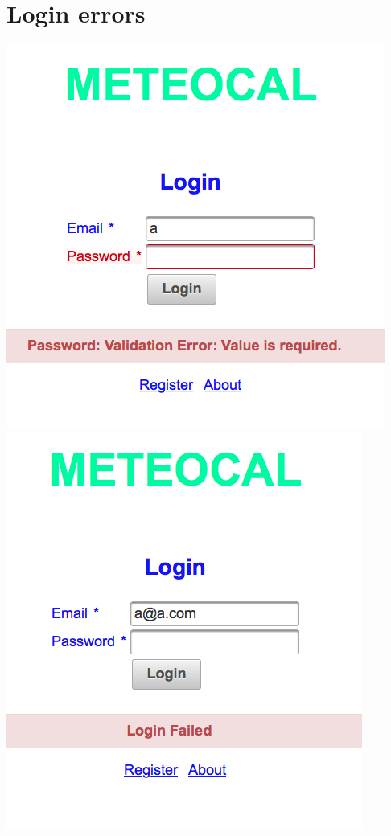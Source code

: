 \documentclass[10pt,a4paper,titlepage]{article}
\begin{document}
\section{Login errors}
\begin{center}
\includegraphics[width=0.7\linewidth]{./images/30_error_login_1}
\includegraphics[width=0.7\linewidth]{./images/31_error_login_2}
\end{center}
\end{document}
